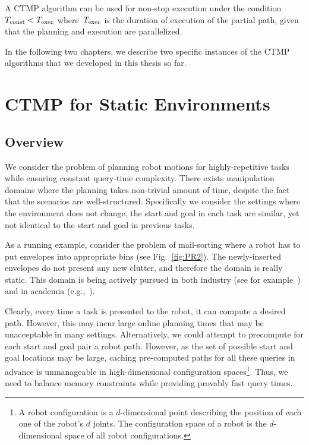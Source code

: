 \documentclass[a4paper]{report}
\begin{document}
\vspace{2mm}
\begin{definition}
A CTMP algorithm can be used for non-stop execution under the condition~$T_{\textrm{const}} < T_{\textrm{exec}}$ where~$T_{\textrm{exec}}$ is the duration of execution of the partial path, given that the planning and execution are parallelized. 
\end{definition}
%
In the following two chapters, we describe two specific instances of the CTMP algorithms that we developed in this thesis so far.

\newpage
\chapter{CTMP for Static Environments}
\label{chap:icaps}
\section{Overview}
We consider the problem of planning robot motions for highly-repetitive tasks while ensuring constant query-time complexity. There exists manipulation domains where the planning takes non-trivial amount of time, despite the fact that the scenarios are well-structured. Specifically we consider the settings where the environment does not change, the start and goal in each task are similar, yet not identical to the start and goal in previous tasks.

As a running example, consider the problem of mail-sorting where a robot has to put envelopes into appropriate bins (see Fig.~\ref{fig:PR2}). The newly-inserted envelopes do not present any new clutter, and therefore the domain is really static. This domain is being actively pursued in both industry (see for example~\cite{DBot}) and in academia (e.g.,~\cite{hwang2015lazy}).



Clearly, every time a task is presented to the robot, it can compute a desired path.
However, this may incur large online planning times that may be unacceptable in many settings.
%
Alternatively, we could attempt to precompute for each start and goal pair a robot path.
However, as the set of possible start and goal locations may be large, caching pre-computed paths for all these queries in advance is unmanageable in high-dimensional configuration spaces\footnote{
A robot configuration is a $d$-dimensional point describing the position of each one of the robot's $d$ joints.
The configuration space of a robot is the $d$-dimensional space of all robot configurations.}.
Thus, we need to balance memory constraints while providing provably fast query times.
\end{document}
